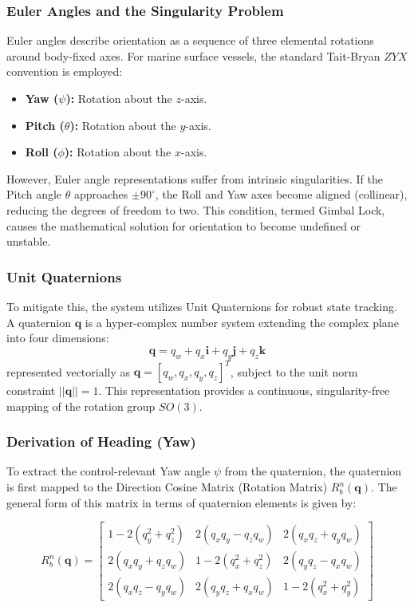 \documentclass[12pt, a4paper, oneside]{report}
\begin{document}
\subsubsection{Euler Angles and the Singularity Problem}
Euler angles describe orientation as a sequence of three elemental rotations around body-fixed axes. For marine surface vessels, the standard Tait-Bryan $ZYX$ convention is employed:
\begin{itemize}
    \item \textbf{Yaw ($\psi$):} Rotation about the $z$-axis.
    \item \textbf{Pitch ($\theta$):} Rotation about the $y$-axis.
    \item \textbf{Roll ($\phi$):} Rotation about the $x$-axis.
\end{itemize}
However, Euler angle representations suffer from intrinsic singularities. If the Pitch angle $\theta$ approaches $\pm 90^\circ$, the Roll and Yaw axes become aligned (collinear), reducing the degrees of freedom to two. This condition, termed Gimbal Lock, causes the mathematical solution for orientation to become undefined or unstable.

\subsubsection{Unit Quaternions}
To mitigate this, the system utilizes Unit Quaternions  for robust state tracking. A quaternion $\mathbf{q}$ is a hyper-complex number system extending the complex plane into four dimensions:
\begin{equation}
    \mathbf{q} = q_w + q_x \mathbf{i} + q_y \mathbf{j} + q_z \mathbf{k}
\end{equation}
represented vectorially as $\mathbf{q} = [q_w, q_x, q_y, q_z]^T$, subject to the unit norm constraint $||\mathbf{q}|| = 1$. This representation provides a continuous, singularity-free mapping of the rotation group $SO(3)$.

\subsubsection{Derivation of Heading (Yaw)}
To extract the control-relevant Yaw angle $\psi$ from the quaternion, the quaternion is first mapped to the Direction Cosine Matrix (Rotation Matrix) $R_b^n(\mathbf{q})$. The general form of this matrix in terms of quaternion elements is given by:

\begin{equation}
    R_b^n(\mathbf{q}) = 
    \begin{bmatrix} 
    1 - 2(q_y^2 + q_z^2) & 2(q_x q_y - q_z q_w) & 2(q_x q_z + q_y q_w) \\
    2(q_x q_y + q_z q_w) & 1 - 2(q_x^2 + q_z^2) & 2(q_y q_z - q_x q_w) \\
    2(q_x q_z - q_y q_w) & 2(q_y q_z + q_x q_w) & 1 - 2(q_x^2 + q_y^2)
    \end{bmatrix}
\end{equation}
\end{document}
